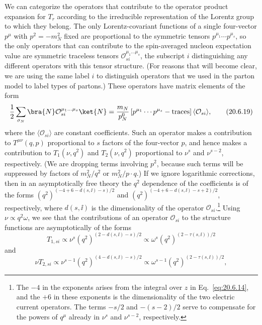 We can categorize the operators that contribute to the operator product expansion for $T_r$ according to the irreducible representation of the Lorentz group to which they belong. The only Lorentz-covariant functions of a single four-vector $p^\mu$ with $p^2=-m_N^2$ fixed are proportional to the symmetric tensors $p^{\mu_1}\cdots p^{\mu_s}$, so the only operators that can contribute to the spin-averaged nucleon expectation value are symmetric traceless tensors $\mathcal O_{si}^{\mu_1\ldots\mu_s}$, the subscript $i$ distinguishing any different operators with this tensor structure. (For reasons that will become clear, we are using the same label $i$ to distinguish operators that we used in the parton model to label types of partons.) These operators have matrix elements of the form
\begin{equation}
\frac12\sum_{\sigma_N}
\bra{N}\mathcal O_{si}^{\mu_1\ldots\mu_s}\ket{N}
=\frac{m_N}{p_N^0}
\left[p^{\mu_1}\cdots p^{\mu_s}-\text{traces}\right]
\langle\mathcal O_{si}\rangle,
\tag{20.6.19}\label{eq:20.6.19}
\end{equation}
where the $\langle\mathcal O_{si}\rangle$ are constant coefficients. Such an operator makes a contribution to $T^{\mu\nu}(q,p)$ proportional to $s$ factors of the four-vector $p$, and hence makes a contribution to $T_1(\nu,q^2)$ and $T_2(\nu,q^2)$ proportional to $\nu^s$ and $\nu^{s-2}$, respectively. (We are dropping terms involving $p^2$, because such terms will be suppressed by factors of $m_N^2/q^2$ or $m_N^2/p\cdot q$.) If we ignore logarithmic corrections, then in an asymptotically free theory the $q^2$ dependence of the coefficients is of the forms $(q^2)^{(-4+6-d(s,\ii)-s)/2}$ and $(q^2)^{(-4+6-d(s,\ii)-s+2)/2}$, respectively, where $d(s,\ii)$ is the dimensionality of the operator $\mathcal O_{si}$.\footnote{The $-4$ in the exponents arises from the integral over $z$ in Eq.~\eqref{eq:20.6.14}, and the $+6$ in these exponents is the dimensionality of the two electric current operators. The terms $-s/2$ and $-(s-2)/2$ serve to compensate for the powers of $q^\mu$ already in $\nu^s$ and $\nu^{s-2}$, respectively.} Using $\nu\propto q^2\omega$, we see that the contributions of an operator $\mathcal O_{si}$ to the structure functions are asymptotically of the forms
\begin{equation}
T_{1,si}\propto
\nu^s(q^2)^{(2-d(s,\ii)-s)/2}
\propto
\omega^s(q^2)^{(2-\tau(s,\ii))/2}
\tag{20.6.20}\label{eq:20.6.20}
\end{equation}
and
\begin{equation}
\nu T_{2,si}\propto
\nu^{s-1}(q^2)^{(4-d(s,\ii)-s)/2}
\propto
\omega^{s-1}(q^2)^{(2-\tau(s,\ii))/2},
\tag{20.6.21}\label{eq:20.6.21}
\end{equation}
